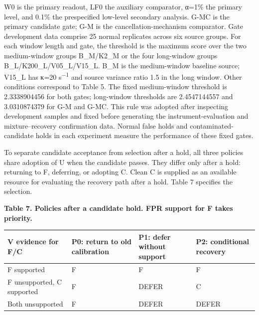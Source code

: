 \documentclass[10pt,a4paper]{article}
\newlength{\usable}
\begin{document}
W0 is the primary readout, LF0 the auxiliary comparator, α=1\% the primary level, and 0.1\% the prespecified low-level secondary analysis. G-MC is the primary candidate gate; G-M is the cancellation-mechanism comparator. Gate development data comprise 25 normal replicates across six source groups. For each window length and gate, the threshold is the maximum score over the two medium-window groups B\_M/K2\_M or the four long-window groups B\_L/K200\_L/V05\_L/V15\_L. B\_M is the medium-window baseline source; V15\_L has κ=20 s\textsuperscript{−}\textsuperscript{1} and source variance ratio 1.5 in the long window. Other conditions correspond to Table 5. The fixed medium-window threshold is 2.3338904456 for both gates; long-window thresholds are 2.4547144557 and 3.0310874379 for G-M and G-MC. This rule was adopted after inspecting development samples and fixed before generating the instrument-evaluation and mixture–recovery confirmation data. Normal false holds and contaminated-candidate holds in each experiment measure the performance of these fixed gates.

To separate candidate acceptance from selection after a hold, all three policies share adoption of U when the candidate passes. They differ only after a hold: returning to F, deferring, or adopting C. Clean C is supplied as an available resource for evaluating the recovery path after a hold. Table 7 specifies the selection.

\begin{table}[H]\fontsize{9.3}{12}\selectfont
\setlength{\usable}{\dimexpr\linewidth-6\tabcolsep\relax}
{\raggedright \textbf{Table 7. Policies after a candidate hold. FPR support for F takes priority.}\par}\vspace{3pt}
\noindent\begin{tabular}{@{}>{\raggedright\arraybackslash}p{0.25\usable}>{\raggedright\arraybackslash}p{0.25\usable}>{\raggedright\arraybackslash}p{0.24\usable}>{\raggedright\arraybackslash}p{0.26\usable}@{}}
\toprule
\bfseries V evidence for F/C & \bfseries P0: return to old calibration & \bfseries P1: defer without support & \bfseries P2: conditional recovery \\
\midrule
F supported & F & F & F \\
F unsupported, C supported & F & DEFER & C \\
Both unsupported & F & DEFER & DEFER \\
\bottomrule\end{tabular}\end{table}
\end{document}
